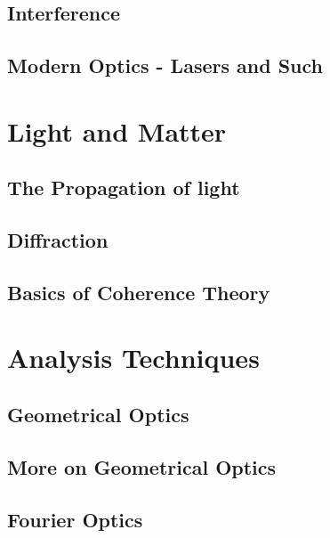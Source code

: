 \documentclass[12pt]{report}
\begin{document}
\chapter{Interference}
\chapter{Modern Optics - Lasers and Such}



\part{Light and Matter}

\chapter{The Propagation of light}
\chapter{Diffraction}
\chapter{Basics of Coherence Theory}

\part{Analysis Techniques}
\chapter{Geometrical Optics}
\chapter{More on Geometrical Optics}
\chapter{Fourier Optics}
\end{document}
